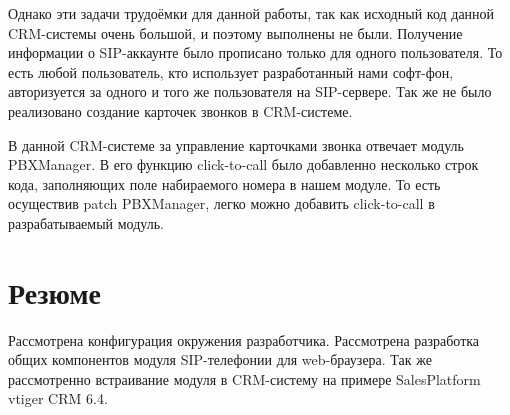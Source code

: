 Однако эти задачи трудоёмки для данной работы, так как исходный код данной CRM-системы очень большой, и поэтому выполнены не были. Получение информации о SIP-аккаунте было прописано только для одного пользователя. То есть любой пользователь, кто использует разработанный нами софт-фон, авторизуется за одного и того же пользователя на SIP-сервере. Так же не было реализовано создание карточек звонков в CRM-системе.

В данной CRM-системе за управление карточками звонка отвечает модуль PBXManager. В его функцию click-to-call было добавленно несколько строк кода, заполняющих поле набираемого номера в нашем модуле. То есть осуществив patch PBXManager, легко можно добавить click-to-call в разрабатываемый модуль.

\section{Резюме}

Рассмотрена конфигурация окружения разработчика. Рассмотрена разработка общих компонентов модуля SIP-телефонии для web-браузера. Так же рассмотренно встраивание модуля в CRM-систему на примере SalesPlatform vtiger CRM 6.4.
